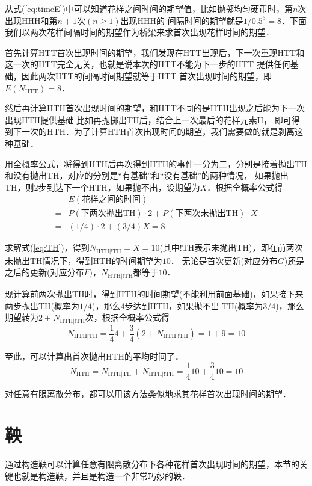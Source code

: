 \documentclass{article}
\begin{document}
从式(\ref{eq:timeE})中可以知道花样之间时间的期望值，比如抛掷均匀硬币时，第$n$次出现HHH和第$n+1$次$(n \geqslant 1)$出现HHH的
间隔时间的期望就是$1/0.5^3=8$．下面我们以两次花样间隔时间的期望作为桥梁来求首次出现花样时间的期望．

首先计算HTT首次出现时间的期望，我们发现在HTT出现后，下一次重现HTT和这一次的HTT完全无关，也就是说本次的HTT不能为下一步的HTT
提供任何基础，因此两次HTT的间隔时间期望就等于HTT 首次出现时间的期望，即$E(N_\text{HTT})=8$．

然后再计算HTH首次出现时间的期望，和HTT不同的是HTH出现之后能为下一次出现HTH提供基础比如再抛掷出TH后，结合上一次最后的花样元素H，
即可得到下一次的HTH．为了计算HTH首次出现时间的期望，我们需要做的就是剥离这种基础．

用全概率公式，将得到HTH后再次得到HTH的事件一分为二，分别是接着抛出TH和没有抛出TH，对应的分别是“有基础”和“没有基础”的两种情况，
如果抛出TH，则$2$步到达下一个HTH，如果抛不出，设期望为$X$．根据全概率公式得
\begin{equation}\label{eq:TH}
\begin{array}{rl}
  &E(\text{花样之间的时间})\\
  =&P(\text{下两次抛出TH})\cdot 2 + P(\text{下两次未抛出TH})\cdot X\\
  =&(1/4)\cdot 2 + (3/4) X
  =8
\end{array}
\end{equation}

求解式(\ref{eq:TH})，得到$N_\text{HTH|!TH}=X=10$(其中!TH表示未抛出TH)，即在前两次未抛出TH情况下，得到HTH的时间期望为$10$．
无论是首次更新(对应分布$G$)还是之后的更新(对应分布$F$)，$N_\text{HTH|!TH}$都等于$10$．

现计算前两次抛出TH时，得到HTH的时间期望(不能利用前面基础)，如果接下来两步抛出TH(概率为$1/4$)，那么$4$步达到HTH，如果抛不出
TH(概率为$3/4$)，那么期望转为$2+N_\text{HTH|!TH}$次，根据全概率公式得
\begin{equation}
  N_\text{HTH|TH}=\frac{1}{4}4 + \frac{3}{4}(2+N_\text{HTH|!TH})=1+9=10
\end{equation}

至此，可以计算出首次抛出HTH的平均时间了．
\begin{equation}
  N_\text{HTH}=N_\text{HTH|TH}+N_\text{HTH|!TH}=\frac{1}{4}10 + \frac{3}{4}10=10
\end{equation}

对任意有限离散分布，都可以用该方法类似地求其花样首次出现时间的期望．

\section{鞅}
通过构造鞅可以计算任意有限离散分布下各种花样首次出现时间的期望，本节的关键也就是构造鞅，并且是构造一个非常巧妙的鞅．
\end{document}
